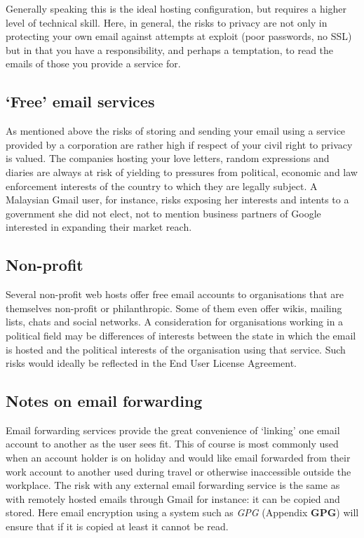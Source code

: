 Generally speaking this is the ideal hosting configuration, but requires
a higher level of technical skill. Here, in general, the risks to
privacy are not only in protecting your own email against attempts at
exploit (poor passwords, no SSL) but in that you have a responsibility,
and perhaps a temptation, to read the emails of those you provide a
service for.

\subsection{`Free' email services}

As mentioned above the risks of storing and sending your email using a
service provided by a corporation are rather high if respect of your
civil right to privacy is valued. The companies hosting your love
letters, random expressions and diaries are always at risk of yielding
to pressures from political, economic and law enforcement interests of
the country to which they are legally subject. A Malaysian Gmail user,
for instance, risks exposing her interests and intents to a government
she did not elect, not to mention business partners of Google interested
in expanding their market reach.

\subsection{Non-profit}

Several non-profit web hosts offer free email accounts to organisations
that are themselves non-profit or philanthropic. Some of them even offer
wikis, mailing lists, chats and social networks. A consideration for
organisations working in a political field may be differences of
interests between the state in which the email is hosted and the
political interests of the organisation using that service. Such risks
would ideally be reflected in the End User License Agreement.

\subsection{Notes on email forwarding}

Email forwarding services provide the great convenience of `linking' one
email account to another as the user sees fit. This of course is most
commonly used when an account holder is on holiday and would like email
forwarded from their work account to another used during travel or
otherwise inaccessible outside the workplace. The risk with any external
email forwarding service is the same as with remotely hosted emails
through Gmail for instance: it can be copied and stored. Here email
encryption using a system such as \emph{GPG} (Appendix \textbf{GPG})
will ensure that if it is copied at least it cannot be read.
